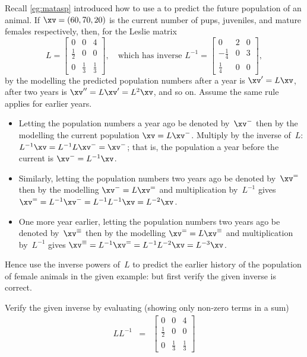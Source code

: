 \begin{example} \label{eg:invph}
Recall \autoref{eg:matasp} introduced how to use a  to predict the future population of an animal.
If \(\xv=(60,70,20)\) is the current number of pups, juveniles, and mature females respectively, then, for the Leslie matrix
\begin{equation*}
L=\begin{bmatrix} 0&0&4\\\frac12&0&0\\0&\frac13&\frac13 \end{bmatrix},
\quad\text{which has inverse }L^{-1}=\begin{bmatrix} 0&2&0\\-\frac14&0&3\\\frac14&0&0 \end{bmatrix},
\end{equation*} 
 by the modelling the predicted population numbers after a year is \(\xv'=L\xv\), after two years is \(\xv''=L\xv'=L^2\xv\), and so on.
Assume the same rule applies for earlier years.
\begin{itemize}
\item Letting the population numbers a year ago be denoted by~\(\xv^-\) then by the modelling the current population \(\xv=L\xv^-\).
Multiply by the inverse of~\(L\): \(L^{-1}\xv=L^{-1}L\xv^-=\xv^-\); that is, the population a year before the current is \(\xv^-=L^{-1}\xv\).
\item Similarly, letting the population numbers two years ago be denoted by~\(\xv^=\) then  by the modelling \(\xv^-=L\xv^=\) and multiplication by~\(L^{-1}\) gives \(\xv^==L^{-1}\xv^-=L^{-1}L^{-1}\xv=L^{-2}\xv\).
\item One more year earlier, letting the population numbers two years ago be denoted by~\(\xv^\equiv\) then  by the modelling \(\xv^==L\xv^\equiv\) and multiplication by~\(L^{-1}\) gives \(\xv^\equiv=L^{-1}\xv^==L^{-1}L^{-2}\xv=L^{-3}\xv\).
\end{itemize}
Hence use the inverse powers of~\(L\) to predict the earlier history of the population of female animals in the given example: but first verify the given inverse is correct.
\begin{solution} 
Verify the given inverse by evaluating (showing only non-zero terms in a sum)
\begin{eqnarray*}
LL^{-1}&=&
\begin{bmatrix} 0&0&4\\\frac12&0&0\\0&\frac13&\frac13 \end{bmatrix}

\end{eqnarray*}
\end{solution}
\end{example}
